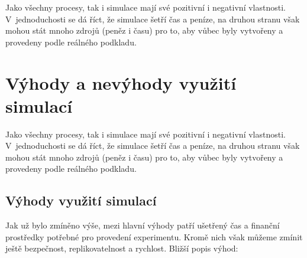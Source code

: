 Jako všechny procesy, tak i simulace mají své pozitivní i negativní vlastnosti. V~jednoduchosti se dá říct, že simulace šetří čas a peníze, na druhou stranu však mohou stát mnoho zdrojů (peněz i času) pro to, aby vůbec byly vytvořeny a provedeny podle reálného podkladu.

\section{Výhody a nevýhody využití simulací}

Jako všechny procesy, tak i simulace mají své pozitivní i negativní vlastnosti. V~jednoduchosti se dá říct, že simulace šetří čas a peníze, na druhou stranu však mohou stát mnoho zdrojů (peněz i času) pro to, aby vůbec byly vytvořeny a provedeny podle reálného podkladu.

\subsection{Výhody využití simulací}
\label{vyhody}
Jak už bylo zmíněno výše, mezi hlavní výhody patří  ušetřený čas a finanční prostředky potřebné pro provedení experimentu. Kromě nich však můžeme zmínit ještě bezpečnost, replikovatelnost a rychlost. Bližší popis výhod:

